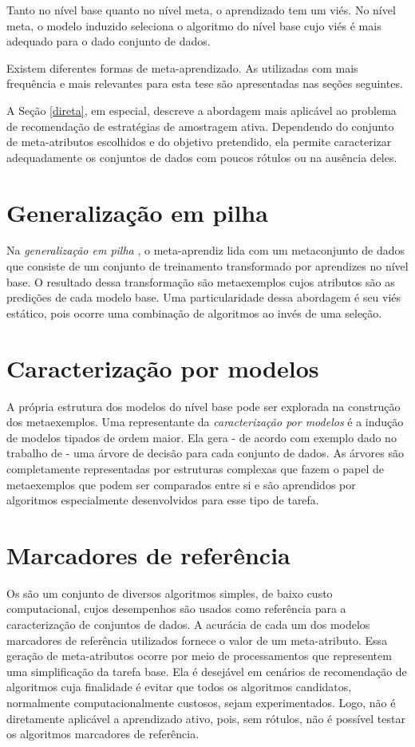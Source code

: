 Tanto no nível base quanto no nível meta, o aprendizado tem um viés.
No nível meta, o modelo induzido seleciona o algoritmo do nível base cujo viés é mais adequado para o dado conjunto de dados.

Existem diferentes formas de meta-aprendizado.
As utilizadas com mais frequência e mais relevantes para esta tese são apresentadas nas seções seguintes.

A Seção \ref{direta}, em especial, descreve a abordagem mais aplicável ao problema de recomendação de estratégias de amostragem ativa.
Dependendo do conjunto de meta-atributos escolhidos e do objetivo pretendido, ela permite caracterizar adequadamente os conjuntos de dados com 
poucos rótulos ou na ausência deles.

\section{Generalização em pilha}
Na \textit{generalização em pilha}
\cite{journals/nn/Wolpert92}, o meta-aprendiz lida com um metaconjunto de dados que consiste de um conjunto de treinamento transformado por aprendizes no nível base.
O resultado dessa transformação são metaexemplos cujos atributos são as predições de cada modelo base.
Uma particularidade dessa abordagem é seu viés estático, pois ocorre uma combinação de algoritmos ao invés de uma seleção.

\section{Caracterização por modelos}
A própria estrutura dos modelos do nível base pode ser explorada na construção dos metaexemplos.
Uma representante da \textit{caracterização por modelos} é a indução de modelos tipados de ordem maior.
Ela gera - de acordo com exemplo dado no trabalho de
 - uma árvore de decisão para cada
conjunto de dados.
As árvores são completamente representadas por estruturas complexas
que fazem o papel de metaexemplos que podem ser comparados entre si
e são aprendidos por algoritmos especialmente
desenvolvidos para esse tipo de tarefa.

\section{Marcadores de referência}
Os  \cite{pfahringer2000tell}
são um conjunto de diversos algoritmos simples, de baixo custo computacional, cujos desempenhos são usados como referência para a caracterização de conjuntos de dados.
A acurácia de cada um dos modelos marcadores de referência utilizados fornece o valor de um meta-atributo.
Essa geração de meta-atributos ocorre por meio de processamentos que representem uma simplificação da tarefa base.
Ela é desejável em cenários de recomendação de algoritmos cuja finalidade é evitar que todos os algoritmos candidatos, normalmente computacionalmente custosos, sejam experimentados.
Logo, não é diretamente aplicável a aprendizado ativo, pois, sem rótulos, não é possível testar os algoritmos marcadores de referência.

